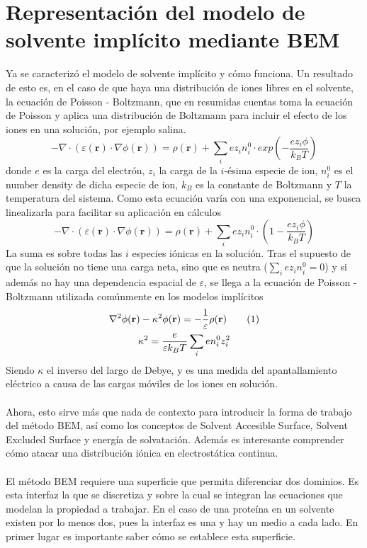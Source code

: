 \documentclass[12pt, oneside, numbers, spanish]{ezthesis}
\newcommand\numberthis{\addtocounter{equation}{1}\tag{\theequation}}
\numberwithin{equation}{section}
\begin{document}
\section{Representación del modelo de solvente implícito mediante BEM}
Ya se caracterizó el modelo de solvente implícito y cómo funciona. Un resultado de esto es, en el caso de que haya una distribución de iones libres en el solvente, la ecuación de Poisson - Boltzmann, que en resumidas cuentas toma la ecuación de Poisson y aplica una distribución de Boltzmann para incluir el efecto de los iones en una solución, por ejemplo salina.
\begin{equation}
-\nabla\cdot(\varepsilon(\mathbf{r})\cdot\nabla\phi(\mathbf{r})) = \rho(\mathbf{r}) + \sum_i ez_in_i^0\cdot exp\left(-\frac{ez_i\phi}{k_BT}\right)
\end{equation}
donde $e$ es la carga del electrón, $z_i$ la carga de la $i$-ésima especie de ion, $n_i^0$ es el number density de dicha especie de ion, $k_B$ es la constante de Boltzmann y $T$ la temperatura del sistema. Como esta ecuación varía con una exponencial, se busca linealizarla para facilitar su aplicación en cálculos
\begin{equation}
-\nabla\cdot(\varepsilon(\mathbf{r})\cdot\nabla\phi(\mathbf{r})) = \rho(\mathbf{r}) + \sum_i ez_in_i^0\cdot \left(1 - \frac{ez_i\phi}{k_BT}\right)
\end{equation}
La suma es sobre todas las $i$ especies iónicas en la solución. Tras el supuesto de que la solución no tiene una carga neta, sino que es neutra ($\sum_i ez_in_i^0 = 0$) y si además no hay una dependencia espacial de $\varepsilon$, se llega a la ecuación de Poisson - Boltzmann utilizada comúnmente en los modelos implícitos
\begin{gather*}
\nabla^2\phi(\mathbf{r}) - \kappa^2\phi(\mathbf{r}) = - \frac{1}{\varepsilon}\rho(\mathbf{r})\numberthis \\
\kappa^2 = \frac{e}{\varepsilon k_BT}\sum_i en_i^0z_i^2
\end{gather*}
Siendo $\kappa$ el inverso del largo de Debye, y es una medida del apantallamiento eléctrico a causa de las cargas móviles de los iones en solución.\\\\
Ahora, esto sirve más que nada de contexto para introducir la forma de trabajo del método BEM, así como los conceptos de Solvent Accesible Surface, Solvent Excluded Surface y energía de solvatación. Además es interesante comprender cómo atacar una distribución iónica en electrostática continua.\\\\
El método BEM requiere una superficie que permita diferenciar dos dominios. Es esta interfaz la que se discretiza y sobre la cual se integran las ecuaciones que modelan la propiedad a trabajar. En el caso de una proteína en un solvente existen por lo menos dos, pues la interfaz es una y hay un medio a cada lado. En primer lugar es importante saber cómo se establece esta superficie.
\end{document}
